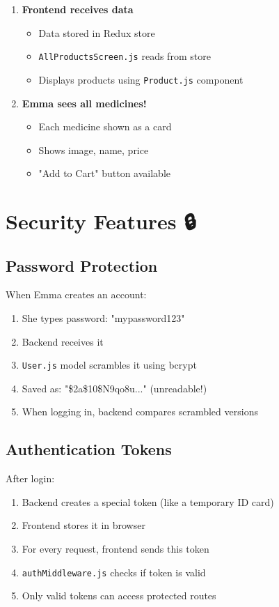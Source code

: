 \documentclass[12pt]{article}
\begin{document}
\begin{enumerate}
    \item \textbf{Frontend receives data}
    \begin{itemize}
        \item Data stored in Redux store
        \item \texttt{AllProductsScreen.js} reads from store
        \item Displays products using \texttt{Product.js} component
    \end{itemize}
    
    \item \textbf{Emma sees all medicines!}
    \begin{itemize}
        \item Each medicine shown as a card
        \item Shows image, name, price
        \item "Add to Cart" button available
    \end{itemize}
\end{enumerate}

\section{Security Features 🔒}

\subsection{Password Protection}

When Emma creates an account:
\begin{enumerate}
    \item She types password: "mypassword123"
    \item Backend receives it
    \item \texttt{User.js} model scrambles it using bcrypt
    \item Saved as: "\$2a\$10\$N9qo8u..." (unreadable!)
    \item When logging in, backend compares scrambled versions
\end{enumerate}

\subsection{Authentication Tokens}

After login:
\begin{enumerate}
    \item Backend creates a special token (like a temporary ID card)
    \item Frontend stores it in browser
    \item For every request, frontend sends this token
    \item \texttt{authMiddleware.js} checks if token is valid
    \item Only valid tokens can access protected routes
\end{enumerate}
\end{document}
